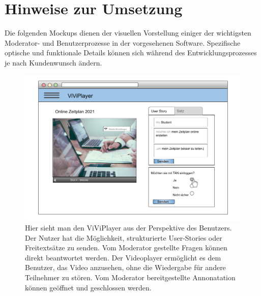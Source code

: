 \section{Hinweise zur Umsetzung}
Die folgenden Mockups dienen der visuellen Vorstellung einiger der wichtigsten Moderator- und Benutzerprozesse in der vorgesehenen Software. Spezifische optische und funktionale Details können sich während des Entwicklungsprozesses je nach Kundenwunsch ändern.
\linebreak
\linebreak

\begin{figure}[h]
  \includegraphics[width=\linewidth]{5dot1.png}
  \caption{Hier sieht man den ViViPlayer aus der Perspektive des Benutzers. Der Nutzer hat die Möglichkeit, strukturierte User-Stories oder Freitextsätze zu senden. Vom Moderator gestellte Fragen können direkt beantwortet werden. Der Videoplayer ermöglicht es dem Benutzer, das Video anzusehen, ohne die Wiedergabe für andere Teilnehmer zu stören. Vom Moderator bereitgestellte Annonatation können geöffnet und geschlossen werden.}
  \label{fig:5dot1}
\end{figure}

